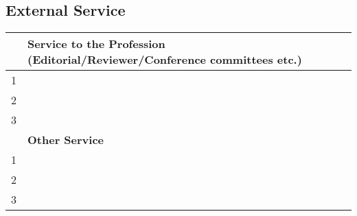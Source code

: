\documentclass[11pt]{article}
\begin{document}

\subsection{External Service}
  \begin{tabular}{ll}
    \toprule
    \textbf{}& \textbf{Service to the Profession (Editorial/Reviewer/Conference committees etc.)}\\
      \midrule
    1& \\
    2& \\
    3& \\
    \toprule
    \textbf{}& \textbf{Other Service}\\
      \midrule
    1& \\
    2& \\
    3& \\
    \bottomrule
  \end{tabular}
\end{document}
